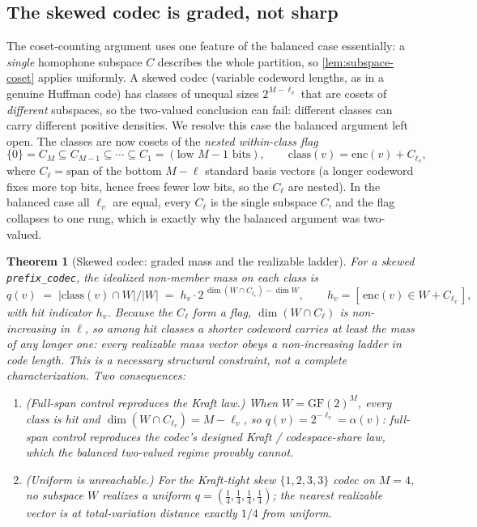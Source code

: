 \documentclass[11pt]{article}
\theoremstyle{definition}
\theoremstyle{plain}
\newtheorem{theorem}{Theorem}[section]
\theoremstyle{remark}
\newcommand{\enc}{\mathrm{enc}}
\newcommand{\GF}{\mathrm{GF}(2)}
\newcommand{\spn}{\mathrm{span}}
\newcommand{\class}{\mathrm{class}}
\newcommand{\W}{W}                          %
\newcommand{\al}{\alpha}                    %
\newcommand{\inter}{\cap}
\begin{document}
\subsection{The skewed codec is graded, not sharp}
\label{sec:t4b}

The coset-counting argument uses one feature of the balanced case essentially: a
\emph{single} homophone subspace $C$ describes the whole partition, so
\cref{lem:subspace-coset} applies uniformly. A skewed codec (variable codeword lengths,
as in a genuine Huffman code) has classes of unequal sizes $2^{M - \ell_v}$ that are
cosets of \emph{different} subspaces, so the two-valued conclusion can fail: different
classes can carry different positive densities. We resolve this case the balanced
argument left open. The classes are now cosets of the \emph{nested within-class flag}
\[
  \{0\} = C_M \subseteq C_{M-1} \subseteq \cdots \subseteq C_1 = (\text{low } M-1 \text{ bits}),
  \qquad
  \class(v) = \enc(v) + C_{\ell_v},
\]
where $C_\ell = \spn$ of the bottom $M - \ell$ standard basis vectors (a longer codeword
fixes more top bits, hence frees fewer low bits, so the $C_\ell$ are nested). In the
balanced case all $\ell_v$ are equal, every $C_\ell$ is the single subspace $C$, and the
flag collapses to one rung, which is exactly why the balanced argument was two-valued.

\begin{theorem}[Skewed codec: graded mass and the realizable ladder]
\label{thm:graded}
For a skewed \texttt{prefix\_codec}, the idealized non-member mass on each class is
\begin{equation}
  q(v) \;=\; |\class(v) \inter \W| / |\W|
       \;=\; h_v \cdot 2^{\,\dim(\W \inter C_{\ell_v}) - \dim \W},
  \qquad
  h_v = [\, \enc(v) \in \W + C_{\ell_v} \,],
  \label{eq:graded}
\end{equation}
with hit indicator $h_v$. Because the $C_\ell$ form a flag, $\dim(\W \inter C_\ell)$ is
non-increasing in $\ell$, so among hit classes a shorter codeword carries at least the
mass of any longer one: every realizable mass vector obeys a \emph{non-increasing ladder}
in code length. This is a \emph{necessary} structural constraint, not a complete
characterization. Two consequences:
\begin{enumerate}
  \item \emph{(Full-span control reproduces the Kraft law.)} When $\W = \GF^M$, every class is hit and
  $\dim(\W \inter C_{\ell_v}) = M - \ell_v$, so $q(v) = 2^{-\ell_v} = \al(v)$: full-span
  control reproduces the codec's designed Kraft / codespace-share law, which the balanced
  two-valued regime provably cannot.
  \item \emph{(Uniform is unreachable.)} For the Kraft-tight skew $\{1,2,3,3\}$ codec on
  $M = 4$, no subspace $\W$ realizes a uniform $q = (\tfrac14,\tfrac14,\tfrac14,\tfrac14)$;
  the nearest realizable vector is at total-variation distance exactly $1/4$ from uniform.
\end{enumerate}
\end{theorem}
\end{document}
